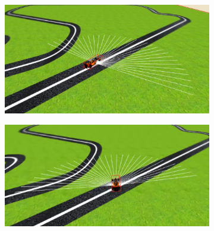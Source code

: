 \begin{itemize}
\newpage
\begin{figure}[h!]
  \begin{subfigure}[b]{0.5\textwidth}
    \includegraphics[width=\textwidth, height=\textwidth]{pistahielo1.png}
  \end{subfigure}
  \hfill
  \hfill
  \begin{subfigure}[b]{0.5\textwidth}
    \includegraphics[width=\textwidth, height=\textwidth]{pistahielo2.png}

\end{subfigure}
\end{figure}
\end{itemize}
